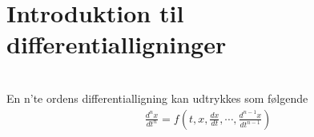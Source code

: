\section{Introduktion til differentialligninger}

\begin{defn} \textbf{}\\
En n'te ordens differentialligning kan udtrykkes som følgende
%
\begin{align*}
    \frac{d^nx}{dt^n}=f\left(t, x, \frac{dx}{dt},\cdots, \frac{d^{n-1}x}{dt^{n-1}}\right )
\end{align*}

\end{defn}